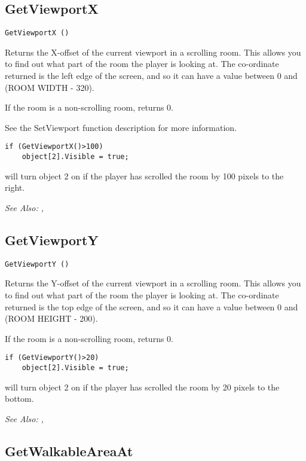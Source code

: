 \subsection{GetViewportX}\label{GetViewportX}%

\begin{verbatim}
GetViewportX ()
\end{verbatim}
Returns the X-offset of the current viewport in a scrolling room. This
allows you to find out what part of the room the player is looking at.
The co-ordinate returned is the left edge of the screen, and so it can
have a value between 0 and (ROOM WIDTH - 320).

If the room is a non-scrolling room, returns 0.

See the SetViewport function description for more information.

\begin{verbatim}
if (GetViewportX()>100)
    object[2].Visible = true;
\end{verbatim}
will turn object 2 on if the player has scrolled the room by 100 pixels to the right.

\it{See Also:} , 

\subsection{GetViewportY}\label{GetViewportY}%

\begin{verbatim}
GetViewportY ()
\end{verbatim}
Returns the Y-offset of the current viewport in a scrolling room. This
allows you to find out what part of the room the player is looking at.
The co-ordinate returned is the top edge of the screen, and so it can
have a value between 0 and (ROOM HEIGHT - 200).

If the room is a non-scrolling room, returns 0.

\begin{verbatim}
if (GetViewportY()>20)
    object[2].Visible = true;
\end{verbatim}
will turn object 2 on if the player has scrolled the room by 20 pixels to the bottom.

\it{See Also:} , 


\subsection{GetWalkableAreaAt}\label{GetWalkableAreaAt}%

